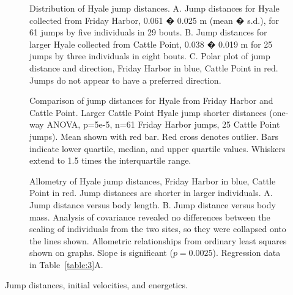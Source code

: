 \documentclass{jeb}
\begin{document}
\begin{figure}
\caption{ Distribution of Hyale jump distances.  A.  Jump distances for Hyale collected from Friday Harbor, 0.061 � 0.025 m (mean � s.d.), for  61 jumps by five individuals in 29 bouts. B.  Jump distances for larger Hyale collected from Cattle Point, 0.038 � 0.019 m for 25 jumps by three individuals in eight bouts.  C.  Polar plot of jump distance and direction, Friday Harbor in blue, Cattle Point in red.  Jumps do not appear to have a preferred direction.}
\label{fig:9}
\end{figure}

\begin{figure}
\caption{Comparison of jump distances for Hyale from Friday Harbor and Cattle Point.  Larger Cattle Point Hyale jump shorter distances (one-way ANOVA, p=5e-5, n=61 Friday Harbor jumps, 25 Cattle Point jumps).  Mean shown with red bar.  Red cross denotes outlier.  Bars indicate lower quartile, median, and upper quartile values. Whiskers extend to 1.5 times the interquartile range.}
\label{fig:10}
\end{figure}

\begin{figure}
\caption{Allometry of Hyale jump distances, Friday Harbor in blue, Cattle Point in red.  Jump distances are shorter in larger individuals.  A.  Jump distance versus body length.  B.  Jump distance versus body mass.  Analysis of covariance revealed no differences between the scaling of individuals from the two sites, so they were collapsed onto the lines shown.   Allometric relationships from ordinary least squares shown on graphs.  Slope is significant ($p=0.0025$).  Regression data in Table~\ref{table:3}A. }
\label{fig:11}
\end{figure}

\begin{table}
\caption{Jump distances, initial velocities, and energetics.}
\label{table:3}
\end{table}
\end{document}

